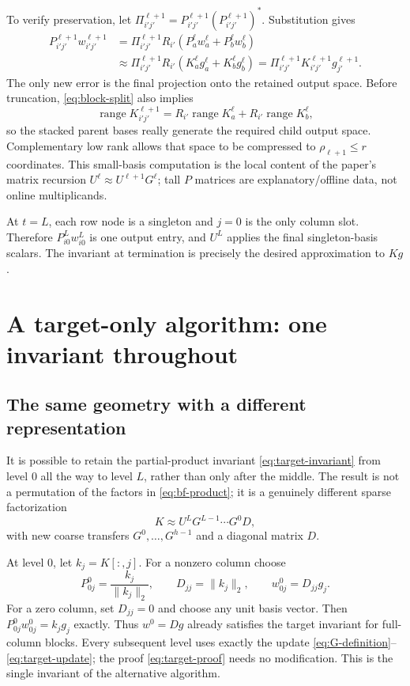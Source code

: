 \documentclass[11pt]{article}
\DeclareMathOperator{\range}{range}
\begin{document}
To verify preservation, let $\Pi_{i'j'}^{\ell+1}=P_{i'j'}^{\ell+1}(P_{i'j'}^{\ell+1})^*$.  Substitution gives
\[
\begin{aligned}
 P_{i'j'}^{\ell+1}w_{i'j'}^{\ell+1}
 &=\Pi_{i'j'}^{\ell+1}R_{i'}(P_a^\ell w_a^\ell+P_b^\ell w_b^\ell)\\
 &\approx\Pi_{i'j'}^{\ell+1}R_{i'}(K_a^\ell g_a^\ell+K_b^\ell g_b^\ell)
 =\Pi_{i'j'}^{\ell+1}K_{i'j'}^{\ell+1}g_{j'}^{\ell+1}.
\end{aligned}
 \tag{13}\label{eq:target-proof}
\]
The only new error is the final projection onto the retained output space.  Before truncation, \eqref{eq:block-split} also implies
\[
 \range K_{i'j'}^{\ell+1}=R_{i'}\range K_a^\ell+R_{i'}\range K_b^\ell,
\]
so the stacked parent bases really generate the required child output space.  Complementary low rank allows that space to be compressed to $\rho_{\ell+1}\le r$ coordinates.  This small-basis computation is the local content of the paper's matrix recursion $U^\ell\approx U^{\ell+1}G^\ell$; tall $P$ matrices are explanatory/offline data, not online multiplicands.

At $t=L$, each row node is a singleton and $j=0$ is the only column slot.  Therefore $P_{i0}^Lw_{i0}^L$ is one output entry, and $U^L$ applies the final singleton-basis scalars.  The invariant at termination is precisely the desired approximation to $Kg$.

\section{A target-only algorithm: one invariant throughout}
\label{sec:target-only}

\subsection{The same geometry with a different representation}

It is possible to retain the partial-product invariant \eqref{eq:target-invariant} from level $0$ all the way to level $L$, rather than only after the middle.  The result is not a permutation of the factors in \eqref{eq:bf-product}; it is a genuinely different sparse factorization
\[
 \boxed{\quad K\approx U^L G^{L-1}\cdots G^0D,\quad}
 \tag{14}\label{eq:target-only-product}
\]
with new coarse transfers $G^0,\dots,G^{h-1}$ and a diagonal matrix $D$.

At level $0$, let $k_j=K[:,j]$.  For a nonzero column choose
\[
 P_{0j}^0=\frac{k_j}{\|k_j\|_2},\qquad D_{jj}=\|k_j\|_2,
 \qquad w_{0j}^0=D_{jj}g_j .
\]
For a zero column, set $D_{jj}=0$ and choose any unit basis vector.  Then $P_{0j}^0w_{0j}^0=k_jg_j$ exactly.  Thus $w^0=Dg$ already satisfies the target invariant for full-column blocks.  Every subsequent level uses exactly the update \eqref{eq:G-definition}--\eqref{eq:target-update}; the proof \eqref{eq:target-proof} needs no modification.  This is the single invariant of the alternative algorithm.
\end{document}

